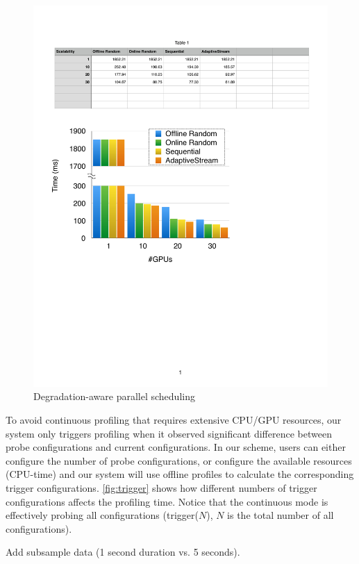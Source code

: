\begin{figure}
  \centering
  \includegraphics[width=0.9\columnwidth]{figures/parallel-placeholder.pdf}
  \caption{Degradation-aware parallel scheduling}
  \label{fig:parallel}
\end{figure}

 To avoid continuous profiling that requires
extensive CPU/GPU resources, our system only triggers profiling when it observed
significant difference between probe configurations and current
configurations. In our scheme, users can either configure the number of probe
configurations, or configure the available resources (CPU-time) and our system
will use offline profiles to calculate the corresponding trigger configurations.
\autoref{fig:trigger} shows how different numbers of trigger configurations
affects the profiling time. Notice that the continuous mode is effectively
probing all configurations (trigger($N$), $N$ is the total number of all
configurations).

Add subsample data (1 second duration vs. 5 seconds).

